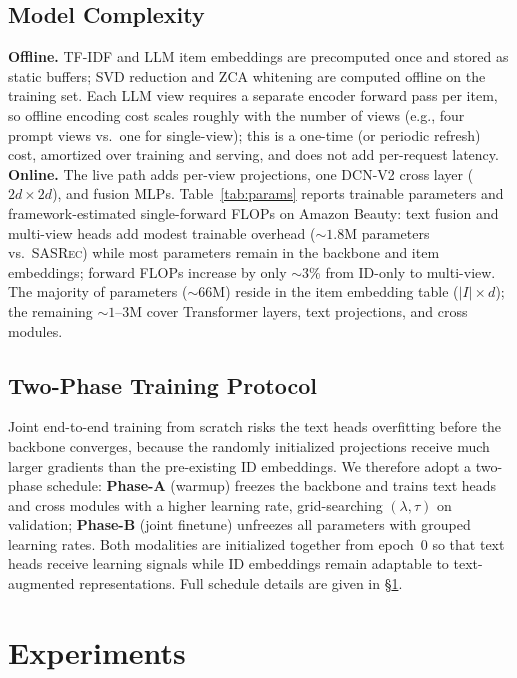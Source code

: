 \documentclass[sigconf,natbib=true,anonymous]{acmart}
\newcommand{\base}{\textsc{SASRec}\xspace}
\newcommand{\tfidf}{\textsc{TF-IDF}\xspace}
\newcommand{\llm}{\textsc{LLM}\xspace}
\begin{document}
\subsection{Model Complexity}\label{sec:complexity}
\textbf{Offline.} \tfidf and \llm item embeddings are precomputed once
and stored as static buffers; SVD reduction and ZCA whitening are computed
offline on the training set.
Each \llm view requires a separate encoder forward pass per item, so
offline encoding cost scales roughly with the number of views (e.g.,
four prompt views vs.\ one for single-view); this is a one-time
(or periodic refresh) cost, amortized over training and serving, and
does not add per-request latency.
\textbf{Online.} The live path adds per-view projections, one DCN-V2
cross layer ($2d{\times}2d$), and fusion MLPs.
Table~\ref{tab:params} reports trainable parameters and framework-estimated
single-forward FLOPs on Amazon Beauty: text fusion and multi-view heads
add modest trainable overhead (${\sim}1.8$M parameters vs.\ \base) while
most parameters remain in the backbone and item embeddings; forward FLOPs
increase by only ${\sim}3\%$ from ID-only to multi-view.
The majority of parameters (${\sim}66$M) reside in the item embedding
table ($|I|{\times}d$); the remaining ${\sim}1$--$3$M cover Transformer
layers, text projections, and cross modules.

\subsection{Two-Phase Training Protocol}
Joint end-to-end training from scratch risks the text heads
overfitting before the backbone converges, because the randomly
initialized projections receive much larger gradients than the
pre-existing ID embeddings. We therefore adopt a two-phase schedule:
\textbf{Phase-A} (warmup) freezes the backbone and trains
text heads and cross modules with a higher learning rate,
grid-searching $(\lambda,\tau)$ on validation;
\textbf{Phase-B} (joint finetune) unfreezes all parameters
with grouped learning rates.
Both modalities are initialized together from epoch~0 so that
text heads receive learning signals while ID embeddings remain
adaptable to text-augmented representations.
Full schedule details are given in \S\ref{sec:experiments}.

\section{Experiments}\label{sec:experiments}
\end{document}
